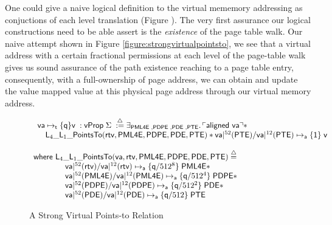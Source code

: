 \begin{remark}
  \label{rem:strongvmem}
  One could give a naive logical definition to the virtual mememory addressing as conjuctions of each level translation (Figure ). The very first assurance our logical constructions need to be able assert is the \textit{existence} of the page table walk. Our naive attempt shown in Figure \ref{figure:strongvirtualpointsto}, we see that a virtual address with a certain fractional permissions at each level of the page-table walk gives us sound assurance of the path existence reaching to a page table entry, consequently, with a full-ownership of page address, we can obtain and update the value mapped value at this physical page address through our virtual memory address. 

\begin{figure}
  \[
  \begin{array}{l}
\begin{array}{l}
  \mathsf{va}\mapsto_{\textsf{t}}\{\textsf{q}\}\textsf{v}\; : \mathsf{vProp} \; \Sigma \;  \stackrel{{\triangle}}{:=} 
  \exists_{\textsf{PML4E} \;, \textsf{PDPE} \;, \textsf{PDE} \;,\textsf{PTE}} \ldotp 

  \ulcorner \textsf{aligned } \mathsf{va} \urcorner \ast  \\
 \quad \textsf{L}_{4}\_\textsf{L}_{1}\_\textsf{PointsTo}(\textsf{rtv},\textsf{PML4E},\textsf{PDPE},\textsf{PDE},\textsf{PTE}) \ast \mathsf{va}|^{52}(\textsf{PTE}) / \mathsf{va}|^{12}(\textsf{PTE}) \mapsto_{\mathsf{a}}\{\mathsf{1}\}\;\textsf{v} 
\end{array} \\
\\
\textsf{where   }\textsf{L}_{4}\_\textsf{L}_{1}\_\textsf{PointsTo}(\mathsf{va},\textsf{rtv},\textsf{PML4E},\textsf{PDPE},\textsf{PDE},\textsf{PTE}) \stackrel{\triangle}{=} \\
 \qquad\qquad \mathsf{va}|^{52}(\textsf{rtv}) / \mathsf{va}|^{12}(\textsf{rtv}) \mapsto_{\mathsf{a}}\{\mathsf{q}/512^{8}\}\;\textsf{PML4E} \ast \\ 
 \qquad\qquad  \mathsf{va}|^{52}(\textsf{PML4E}) / \mathsf{va}|^{12}(\textsf{PML4E}) \mapsto_{\mathsf{a}}\{\mathsf{q}/512^{4}\}\;\textsf{PDPE}  \ast  \\
  \qquad\qquad \mathsf{va}|^{52}(\textsf{PDPE}) / \mathsf{va}|^{12}(\textsf{PDPE}) \mapsto_{\mathsf{a}}\{\mathsf{q}/512^{2}\}\;\textsf{PDE} \ast \\
  \qquad\qquad \mathsf{va}|^{52}(\textsf{PDE}) / \mathsf{va}|^{12}(\textsf{PDE}) \mapsto_{\mathsf{a}}\{\mathsf{q}/512\}\;\textsf{PTE} 
   \end{array}
\]
\caption{A Strong Virtual Points-to Relation}
  \label{fig:strongvirtualpointsto}
\end{figure}
\end{remark}

